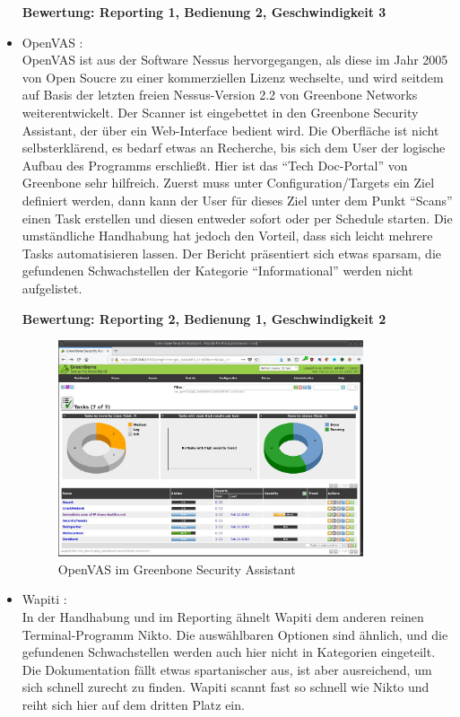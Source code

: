 \documentclass[12pt,oneside,a4paper,parskip,pointlessnumbers]{scrbook}
\begin{document}
\begin{itemize}
            \textbf{Bewertung: Reporting 1, Bedienung 2, Geschwindigkeit 3}
          \item OpenVAS \cite{OpenVAS}:\\
            OpenVAS ist aus der Software Nessus hervorgegangen, als diese im Jahr 2005 von Open Soucre zu einer kommerziellen Lizenz wechselte, und wird seitdem auf Basis der letzten freien Nessus-Version 2.2 von Greenbone Networks weiterentwickelt. Der Scanner ist eingebettet in den Greenbone Security Assistant, der über ein Web-Interface bedient wird. Die Oberfläche ist nicht selbsterklärend, es bedarf etwas an Recherche, bis sich dem User der logische Aufbau des Programms erschließt. Hier ist das ``Tech Doc-Portal'' von Greenbone sehr hilfreich. Zuerst muss unter Configuration/Targets ein Ziel definiert werden, dann kann der User für dieses Ziel unter dem Punkt ``Scans'' einen Task erstellen und diesen entweder sofort oder per Schedule starten.
            Die umständliche Handhabung hat jedoch den Vorteil, dass sich leicht mehrere Tasks automatisieren lassen. Der Bericht präsentiert sich etwas sparsam, die gefundenen Schwachstellen der Kategorie ``Informational'' werden nicht aufgelistet.

            \textbf{Bewertung: Reporting 2, Bedienung 1, Geschwindigkeit 2}
            \begin{figure} [H]
              \centering
              \includegraphics[width=0.85\textwidth]{Images/OpenVAS}
              \caption[OpenVAS im Greenbone Security Assistant]{OpenVAS im Greenbone Security Assistant}
            \end{figure}
          \item Wapiti \cite{Wapiti}:\\
            In der Handhabung und im Reporting ähnelt Wapiti dem anderen reinen Terminal-Programm Nikto. Die auswählbaren Optionen sind ähnlich, und die gefundenen Schwachstellen werden auch hier nicht in Kategorien eingeteilt. Die Dokumentation fällt etwas spartanischer aus, ist aber ausreichend, um sich schnell zurecht zu finden. Wapiti scannt fast so schnell wie Nikto und reiht sich hier auf dem dritten Platz ein.


\end{itemize}
\end{document}
